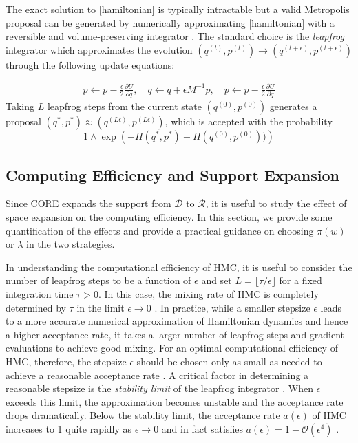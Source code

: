 \documentclass[10pt,fleqn]{article}
\newcommand{\mc}[1]{\mathcal{#1}}
\DeclareMathOperator{\1}{\mathbbm{1}}
\newcommand{\dt}{\epsilon} %
\newcommand{\mass}{M} %
\begin{document}
The exact solution to \eqref{hamiltonian} is typically intractable but a valid Metropolis proposal can be generated by numerically approximating \eqref{hamiltonian} with a reversible and volume-preserving  integrator \citep{neal2011mcmc}. The standard choice is the \textit{leapfrog} integrator which approximates the evolution $(q^{(t)},p^{(t)}) \to (q^{(t + \dt)},p^{(t + \dt)})$ through the following update equations:

\begin{equation}
\begin{aligned}
\label{leap-frog}
p \leftarrow p - \frac{\dt}{2} \frac{\partial U}{\partial  q },\quad
q \leftarrow  q  + \dt \mass^{-1}p,\quad
p \leftarrow p -  \frac{\dt}{2}  \frac{\partial U}{\partial  q } 
\end{aligned}
\end{equation}
Taking $L$ leapfrog steps from the current state $(q^{(0)},p^{(0)})$ generates a proposal $(q^{*},p^{*}) \approx (q^{(L \dt)},p^{(L \dt)})$, which is accepted with the probability 
$$1\wedge \exp  \left( - H(q^{*},p^{*}) + H(q^{(0)},p^{(0)}))\right)$$


\subsection{Computing Efficiency and Support Expansion}

Since CORE expands the support from $\mc D$ to $\mc
R$, it is useful to study the effect of space expansion on the computing efficiency. In this section, we provide some  quantification of the effects and provide a practical guidance on choosing $\pi(w)$ or $\lambda$ in the
two strategies.


In understanding the computational efficiency of HMC, it is useful to
consider the number of leapfrog steps to be a function of $\dt$ and
set $L = \lfloor \tau / \dt \rfloor$ for a fixed integration
time $\tau > 0$. In this case, the mixing rate of HMC is completely
determined by $\tau$ in the limit $\dt \to 0$ \citep{betancourt17}. In
practice, while a smaller stepsize $\dt$ leads to a more accurate
numerical approximation of Hamiltonian dynamics and hence a higher
acceptance rate, it takes a larger number of leapfrog steps and
gradient evaluations to achieve good mixing. For an optimal
computational efficiency of HMC, therefore, the stepsize $\dt$ should
be chosen only as small as needed to achieve a reasonable acceptance
rate \citep{beskos13, betancourt14}. A critical factor in determining
a reasonable stepsize is the \textit{stability limit} of the leapfrog
integrator \citep{neal2011mcmc}. When $\dt$ exceeds this limit, the
approximation becomes unstable and the acceptance rate drops
dramatically. Below the stability limit, the acceptance rate $a(\dt)$
of HMC increases to 1 quite rapidly as $\dt \to 0$ and in fact
satisfies $a(\dt) = 1 - \mc O(\dt^4)$ \citep{beskos13}.
\end{document}

